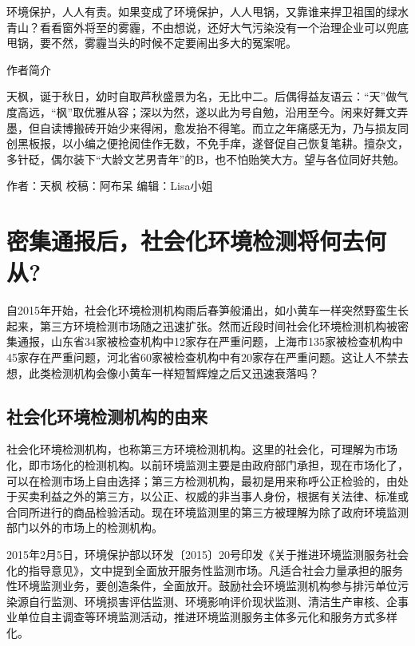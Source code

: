 \documentclass[
]{book}
\begin{document}
环境保护，人人有责。如果变成了环境保护，人人甩锅，又靠谁来捍卫祖国的绿水青山？看看窗外将至的雾霾，不由想说，还好大气污染没有一个治理企业可以兜底甩锅，要不然，雾霾当头的时候不定要闹出多大的冤案呢。

作者简介

天枫，诞于秋日，幼时自取芦秋盛景为名，无比中二。后偶得益友语云：``天''做气度高远，``枫''取优雅从容；深以为然，遂以此为号自勉，沿用至今。闲来好舞文弄墨，但自读博搬砖开始少来得闲，愈发抬不得笔。而立之年痛感无为，乃与损友同创黑板报，以小编之便抢阅佳作无数，不免手痒，遂督促自己恢复笔耕。擅杂文，多针砭，偶尔装下``大龄文艺男青年''的B，也不怕贻笑大方。望与各位同好共勉。

作者：天枫
校稿：阿布呆
编辑：Lisa小姐

\hypertarget{ux5bc6ux96c6ux901aux62a5ux540eux793eux4f1aux5316ux73afux5883ux68c0ux6d4bux5c06ux4f55ux53bbux4f55ux4ece}{%
\section{密集通报后，社会化环境检测将何去何从?}\label{ux5bc6ux96c6ux901aux62a5ux540eux793eux4f1aux5316ux73afux5883ux68c0ux6d4bux5c06ux4f55ux53bbux4f55ux4ece}}

自2015年开始，社会化环境检测机构雨后春笋般涌出，如小黄车一样突然野蛮生长起来，第三方环境检测市场随之迅速扩张。然而近段时间社会化环境检测机构被密集通报，山东省34家被检查机构中12家存在严重问题，上海市135家被检查机构中45家存在严重问题，河北省60家被检查机构中有20家存在严重问题。这让人不禁去想，此类检测机构会像小黄车一样短暂辉煌之后又迅速衰落吗？

\hypertarget{ux793eux4f1aux5316ux73afux5883ux68c0ux6d4bux673aux6784ux7684ux7531ux6765}{%
\subsection{社会化环境检测机构的由来}\label{ux793eux4f1aux5316ux73afux5883ux68c0ux6d4bux673aux6784ux7684ux7531ux6765}}

社会化环境检测机构，也称第三方环境检测机构。这里的社会化，可理解为市场化，即市场化的检测机构。以前环境监测主要是由政府部门承担，现在市场化了，可以在检测市场上自由选择；第三方检测机构，最初是用来称呼公正检验的，由处于买卖利益之外的第三方，以公正、权威的非当事人身份，根据有关法律、标准或合同所进行的商品检验活动。现在环境监测里的第三方被理解为除了政府环境监测部门以外的市场上的检测机构。

2015年2月5日，环境保护部以环发〔2015〕20号印发《关于推进环境监测服务社会化的指导意见》，文中提到全面放开服务性监测市场。凡适合社会力量承担的服务性环境监测业务，要创造条件，全面放开。鼓励社会环境监测机构参与排污单位污染源自行监测、环境损害评估监测、环境影响评价现状监测、清洁生产审核、企事业单位自主调查等环境监测活动，推进环境监测服务主体多元化和服务方式多样化。
\end{document}
